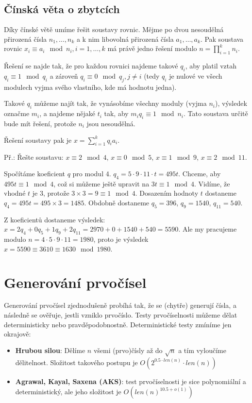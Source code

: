 \documentclass[10pt,a4paper]{article}
\begin{document}
\subsection{Čínská věta o zbytcích}
Díky čínské větě umíme řešit soustavy rovnic. Mějme po dvou nesoudělná přirozená čísla $n_1, \ldots, n_k$ a k nim libovolná přirozená čísla $a_1,\ldots,a_k$. Pak soustava rovnic $x_i \equiv a_i \mod n_i, i = 1,\ldots,k$ má právě jedno řešení modulo $n = \prod_{i=1}^{k}n_i$.

Řešení se najde tak, že pro každou rovnici najdeme takové $q_i$, aby platil vztah $q_i \equiv 1 \mod q_i$ a zároveň $q_i \equiv 0 \mod q_j, j \neq i$ (tedy $q_i$ je nulové ve všech modulech vyjma svého vlastního, kde má hodnotu jedna).

Takové $q_i$ můžeme najít tak, že vynásobíme všechny moduly (vyjma $n_i$), výsledek označme $m_i$, a najdeme nějaké $t_i$ tak, aby $m_iq_i \equiv 1 \mod n_i$. Tato soustava určitě bude mít řešení, protože $n_i$ jsou nesoudělná.

Řešení soustavy pak je $x = \sum_{i=1}^{k}q_ia_i$.

Př.: Řešte soustavu: $x \equiv 2 \mod 4$, $x \equiv 0 \mod 5$, $x \equiv 1 \mod 9$, $x \equiv 2 \mod 11$.

Spočítáme koeficient $q$ pro modul 4. $q_4 = 5\cdot9\cdot11\cdot t = 495t$. Chceme, aby $495t \equiv 1 \mod 4$, což si můžeme ještě upravit na $3t \equiv 1 \mod 4$. Vidíme, že vhodné $t$ je 3, protože $3\times 3 = 9 \equiv 1 \mod 4$. Dosazením hodnoty $t$ dostaneme $q_4 = 495t = 495 \times 3 = 1485$. Obdobně dostaneme $q_5 = 396$, $q_9 = 1540$, $q_{11} = 540$.

Z koeficientů dostaneme výsledek: $x = 2q_4 + 0q_5 + 1q_9 + 2q_{11} = 2970 + 0 + 1540 + 540 = 5590$. Ale my pracujeme modulo $n = 4\cdot5\cdot9\cdot11 = 1980$, proto je výsledek $x = 5590 \equiv 3610 \equiv 1630 \mod 1980$.

\section{Generování prvočísel}
Generování prvočísel zjednodušeně probíhá tak, že se (chytře) generují čísla, a následně se ověřuje, jestli vzniklo prvočíslo. Testy prvočíselnosti můžeme dělat deterministicky nebo pravděpodobnostně. Deterministické testy zmíníme jen okrajově:

\begin{itemize}
\item \textbf{Hrubou silou}: Dělíme $n$ všemi (prvo)čísly až do $\sqrt{n}$ a tím vyloučíme dělitelnost. Složitost takového postupu je $O(2^{0.5\cdot len(n)}\cdot len(n))$
\item \textbf{Agrawal, Kayal, Saxena (AKS)}:  test prvočíselnosti je sice polynomiální a deterministický, ale jeho složitost je $O(len(n)^{10.5 + o(1)})$
\end{itemize}
\end{document}
